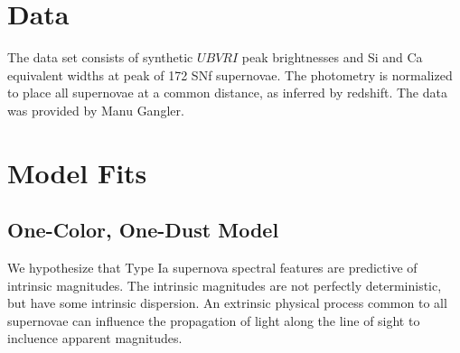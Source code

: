 \documentclass[11pt, oneside]{article}   	%
\begin{document}
\section{Data}
The data set consists of synthetic $UBVRI$ peak brightnesses and Si and Ca equivalent widths at peak
of 172 SNf supernovae.  The photometry is normalized to place all supernovae at a common distance, as
inferred by redshift.
The data was provided by Manu Gangler.

\section{Model Fits}
\subsection{One-Color, One-Dust Model}
\label{onecolor:sec}
We hypothesize that Type Ia supernova spectral features are predictive of intrinsic
magnitudes.  The intrinsic magnitudes are not perfectly deterministic, but have some intrinsic dispersion.
An extrinsic physical process common to all supernovae can influence the propagation
of light along the line of sight to incluence apparent magnitudes. 
\end{document}
